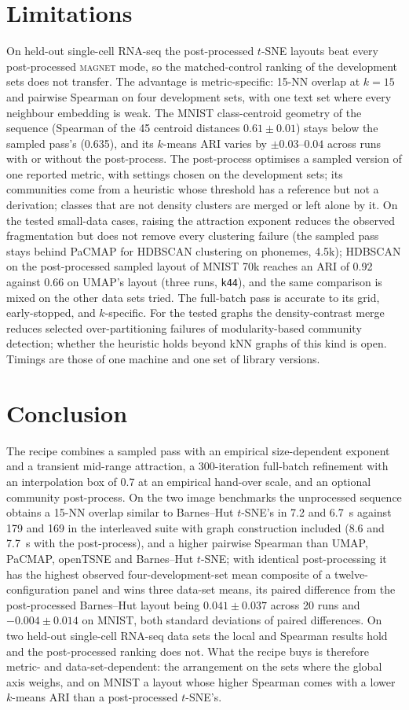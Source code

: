 \documentclass[10pt,twocolumn]{article}
\newcommand{\magnet}{\textsc{magnet}}
\newcommand{\knn}{15-NN}
\begin{document}
\section{Limitations}
On held-out single-cell RNA-seq the post-processed $t$-SNE layouts beat every post-processed \magnet{} mode, so the
matched-control ranking of the development sets does not transfer. The advantage is metric-specific: \knn{} overlap at $k = 15$ and pairwise Spearman on four development sets, with
one text set where every neighbour embedding is weak. The MNIST class-centroid geometry of the sequence (Spearman of the 45 centroid distances $0.61 \pm 0.01$)
stays below the sampled pass's (0.635), and its $k$-means ARI varies by $\pm 0.03$--$0.04$ across runs with or
without the post-process. The post-process optimises a sampled version of one reported metric, with settings chosen on the development
sets; its communities come from a heuristic whose threshold has a reference but not a derivation; classes that
are not density clusters are merged or left alone by it. On the tested small-data cases, raising the attraction exponent reduces the observed fragmentation but does not
remove every clustering failure (the sampled pass stays behind PaCMAP for HDBSCAN clustering on phonemes, 4.5k);
HDBSCAN on the post-processed sampled layout of MNIST 70k reaches an ARI of 0.92 against 0.66 on UMAP's layout
(three runs, \texttt{k44}), and the same comparison is mixed on the other data sets tried. The full-batch pass is accurate to its
grid, early-stopped, and $k$-specific. For the tested graphs the density-contrast merge reduces selected
over-partitioning failures of modularity-based community detection; whether the heuristic holds beyond kNN graphs
of this kind is open. Timings are those of one machine and one set of library versions.

\section{Conclusion}
The recipe combines a sampled pass with an empirical size-dependent exponent and a transient mid-range
attraction, a 300-iteration full-batch refinement with an interpolation box of 0.7 at an empirical hand-over scale,
and an optional community post-process. On the two image benchmarks the unprocessed sequence obtains a \knn{} overlap similar to Barnes--Hut
$t$-SNE's in 7.2 and 6.7~s against 179 and 169 in the interleaved suite with graph construction included (8.6 and
7.7~s with the post-process), and a higher pairwise Spearman than UMAP, PaCMAP, openTSNE and Barnes--Hut $t$-SNE;
with identical post-processing it has the highest observed four-development-set mean composite of a
twelve-configuration panel and wins three data-set means, its paired difference from the post-processed
Barnes--Hut layout being $0.041 \pm 0.037$ across 20 runs and $-0.004 \pm 0.014$ on MNIST, both standard
deviations of paired differences. On two held-out single-cell RNA-seq data sets the local and Spearman results hold and the post-processed ranking
does not. What the recipe buys is therefore metric- and data-set-dependent: the
arrangement on the sets where the global axis weighs, and on MNIST a layout whose higher Spearman comes with a
lower $k$-means ARI than a post-processed $t$-SNE's.
\end{document}
